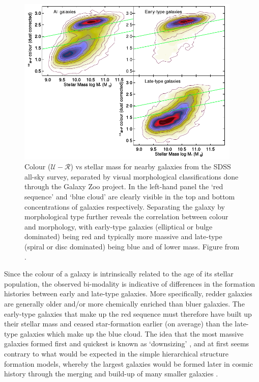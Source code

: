 \begin{figure}
\centering
	  \includegraphics[width=0.95\textwidth]{ColourMass_Schawinski.pdf}
	  \caption[Colour ($\mathcal{U} - \mathcal{R}$) vs stellar mass for nearby galaxies from the SDSS all-sky survey, separated by visual morphological classifications done through the Galaxy Zoo project.]{Colour ($\mathcal{U} - \mathcal{R}$) vs stellar mass for nearby galaxies from the SDSS all-sky survey, separated by visual morphological classifications done through the Galaxy Zoo project. In the left-hand panel the `red sequence' and `blue cloud' are clearly visible in the top and bottom concentrations of galaxies respectively. Separating the galaxy by morphological type further reveals the correlation between colour and morphology, with early-type galaxies (elliptical or bulge dominated) being red and typically more massive and late-type (spiral or disc dominated) being blue and of lower mass. Figure from \citet{Schawinski:2014ep}.}
	  \label{fig:colour_mass}
\end{figure}

Since the colour of a galaxy is intrinsically related to the age of its stellar population, the observed bi-modality is indicative of differences in the formation histories between early and late-type galaxies. More specifically, redder galaxies are generally older and/or more chemically enriched than bluer galaxies. The early-type galaxies that make up the red sequence must therefore have built up their stellar mass and ceased star-formation earlier (on average) than the late-type galaxies which make up the blue cloud. The idea that the most massive galaxies formed first and quickest is known as `downsizing' \citep{Cowie:1996fb}, and at first seems contrary to what would be expected in the simple hierarchical structure formation models, whereby the largest galaxies would be formed later in cosmic history through the merging and build-up of many smaller galaxies \citep{DeLucia:2006gl}.

